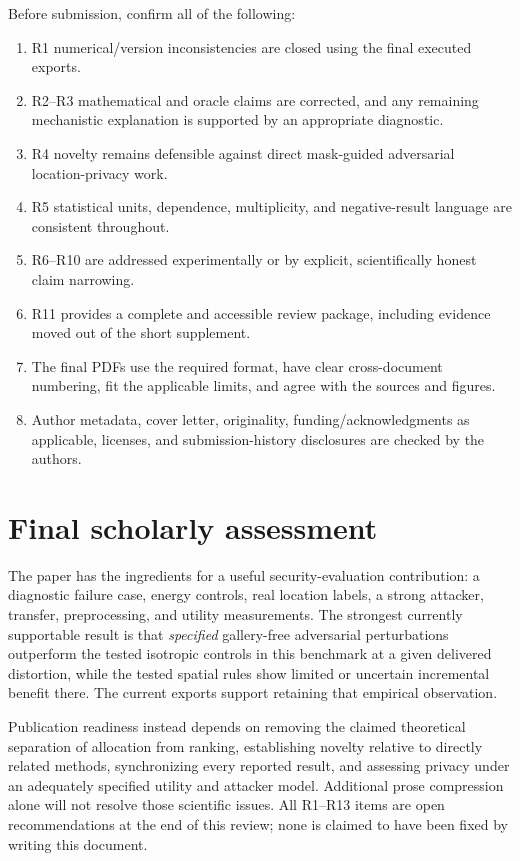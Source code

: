 \documentclass[11pt,a4paper]{article}
\begin{document}
Before submission, confirm all of the following:
\begin{enumerate}
\item R1 numerical/version inconsistencies are closed using the final executed exports.
\item R2--R3 mathematical and oracle claims are corrected, and any remaining mechanistic explanation is supported by an appropriate diagnostic.
\item R4 novelty remains defensible against direct mask-guided adversarial location-privacy work.
\item R5 statistical units, dependence, multiplicity, and negative-result language are consistent throughout.
\item R6--R10 are addressed experimentally or by explicit, scientifically honest claim narrowing.
\item R11 provides a complete and accessible review package, including evidence moved out of the short supplement.
\item The final PDFs use the required format, have clear cross-document numbering, fit the applicable limits, and agree with the sources and figures.
\item Author metadata, cover letter, originality, funding/acknowledgments as applicable, licenses, and submission-history disclosures are checked by the authors.
\end{enumerate}

\section{Final scholarly assessment}

The paper has the ingredients for a useful security-evaluation contribution: a diagnostic failure case, energy controls, real location labels, a strong attacker, transfer, preprocessing, and utility measurements. The strongest currently supportable result is that \emph{specified} gallery-free adversarial perturbations outperform the tested isotropic controls in this benchmark at a given delivered distortion, while the tested spatial rules show limited or uncertain incremental benefit there. The current exports support retaining that empirical observation.

Publication readiness instead depends on removing the claimed theoretical separation of allocation from ranking, establishing novelty relative to directly related methods, synchronizing every reported result, and assessing privacy under an adequately specified utility and attacker model. Additional prose compression alone will not resolve those scientific issues. All R1--R13 items are open recommendations at the end of this review; none is claimed to have been fixed by writing this document.
\end{document}
